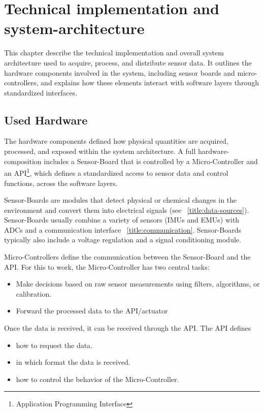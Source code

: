 \chapter{Technical implementation and system-architecture}
This chapter describe the technical implementation and overall system architecture used to acquire, process, and distribute sensor data. It outlines the hardware components involved in the system, including sensor boards and micro-controllers, and explains how these elements interact with software layers through standardized interfaces.

\section{Used Hardware}
The hardware components defined how physical quantities are acquired, processed, and exposed within the system architecture. A full hardware-composition includes a Sensor-Board that is controlled by a Micro-Controller and an API\footnote{Application Programming Interface}, which defines a standardized access to sensor data and control functions, across the software layers.

Sensor-Boards are modules that detect physical or chemical changes in the environment and convert them into electrical signals (see ~\ref{title:data-sources}). Sensor-Boards usually combine a variety of sensors (IMUs and EMUs) with ADCs and a communication interface ~\ref{title:communication}. Sensor-Boards typically also include a voltage regulation and a signal conditioning module. 

\cite{LRWeb:53}

Micro-Controllers define the communication between the Sensor-Board and the API. For this to work, the Micro-Controller has two central tasks:

\begin{itemize}
    \item Make decisions based on raw sensor measurements using filters, algorithms, or calibration.
    \item Forward the processed data to the API/actuator
\end{itemize}

\cite{LRWeb:54}

Once the data is received, it can be received through the API. The API defines

\begin{itemize}
    \item how to request the data.
    \item in which format the data is received.
    \item how to control the behavior of the Micro-Controller.
\end{itemize}

